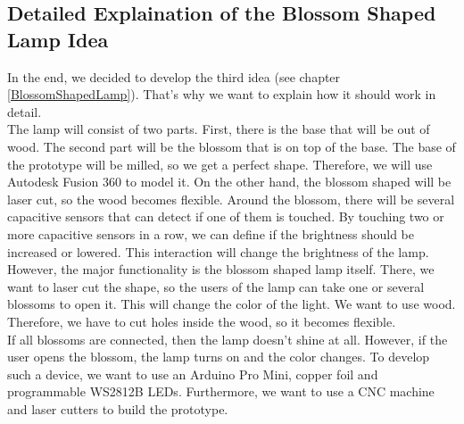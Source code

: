 \documentclass[04_projectProcess.tex]{subfiles}
\begin{document}
    \subsection{Detailed Explaination of the Blossom Shaped Lamp Idea}
        \begin{flushleft}
            In the end, we decided to develop the third idea (see chapter \ref{BlossomShapedLamp}). 
            That's why we want to explain how it should work in detail. \\
            The lamp will consist of two parts. First, there is the base that will be out of wood. The
            second part will be the blossom that is on top of the base. The base of the prototype will 
            be milled, so we get a perfect shape. Therefore, we will use Autodesk Fusion 360\cite{
            autodeskFusion360} to model it. On the other hand, the blossom shaped will be laser cut, 
            so the wood becomes flexible.
            Around the blossom, there will be several capacitive sensors that can detect if one of them 
            is touched. By touching two or more capacitive sensors in a row, we can define if the 
            brightness should be increased or lowered. This interaction will change the brightness of 
            the lamp. \\
            However, the major functionality is the blossom shaped lamp itself. There, we want to laser 
            cut the shape, so the users of the lamp can take one or several blossoms to open it. This will 
            change the color of the light. We want to use wood. Therefore, we have to cut holes inside 
            the wood, so it becomes flexible.\\
            If all blossoms are connected, then the lamp doesn't shine at all. However, if the user opens 
            the blossom, the lamp turns on and the color changes.
            \newline
            \newline
            To develop such a device, we want to use an Arduino Pro Mini, copper foil and programmable 
            WS2812B LEDs. Furthermore, we want to use a CNC machine and laser cutters to build the 
            prototype.
        \end{flushleft}
\end{document}
